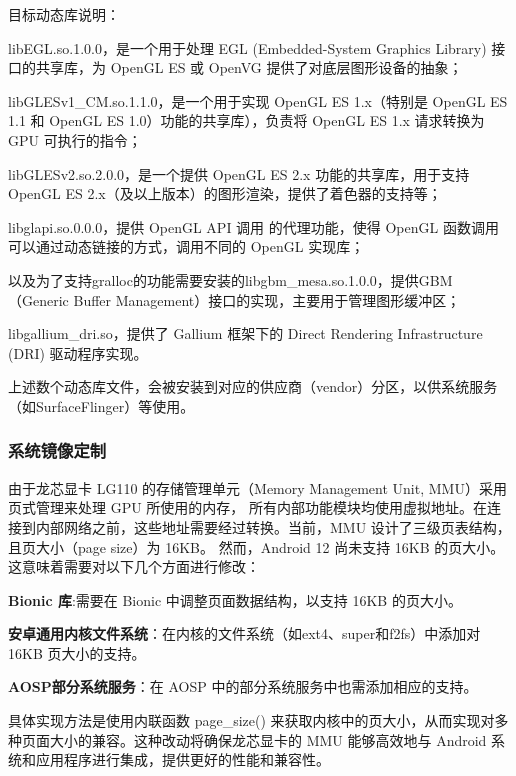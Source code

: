 目标动态库说明：

libEGL.so.1.0.0，是一个用于处理 EGL (Embedded-System Graphics Library) 接口的共享库，为 OpenGL ES 或 OpenVG 提供了对底层图形设备的抽象；

libGLESv1\_CM.so.1.1.0，是一个用于实现 OpenGL ES 1.x（特别是 OpenGL ES 1.1 和 OpenGL ES 1.0）功能的共享库），负责将 OpenGL ES 1.x 请求转换为 GPU 可执行的指令；

libGLESv2.so.2.0.0，是一个提供 OpenGL ES 2.x 功能的共享库，用于支持 OpenGL ES 2.x（及以上版本）的图形渲染，提供了着色器的支持等；

libglapi.so.0.0.0，提供 OpenGL API 调用 的代理功能，使得 OpenGL 函数调用可以通过动态链接的方式，调用不同的 OpenGL 实现库；

以及为了支持gralloc的功能需要安装的libgbm\_mesa.so.1.0.0，提供GBM（Generic Buffer Management）接口的实现，主要用于管理图形缓冲区；

libgallium\_dri.so，提供了 Gallium 框架下的 Direct Rendering Infrastructure (DRI) 驱动程序实现。

上述数个动态库文件，会被安装到对应的供应商（vendor）分区，以供系统服务（如SurfaceFlinger）等使用。

\subsubsection{系统镜像定制}
由于龙芯显卡 LG110 的存储管理单元（Memory Management Unit, MMU）采用页式管理来处理 GPU 所使用的内存，
所有内部功能模块均使用虚拟地址。在连接到内部网络之前，这些地址需要经过转换。当前，MMU 设计了三级页表结构，且页大小（page size）为 16KB。
然而，Android 12 尚未支持 16KB 的页大小。这意味着需要对以下几个方面进行修改：

\textbf{Bionic 库}:需要在 Bionic 中调整页面数据结构，以支持 16KB 的页大小。

\textbf{安卓通用内核文件系统}：在内核的文件系统（如ext4、super和f2fs）中添加对 16KB 页大小的支持。

\textbf{AOSP部分系统服务}：在 AOSP 中的部分系统服务中也需添加相应的支持。

具体实现方法是使用内联函数 page\_size() 来获取内核中的页大小，从而实现对多种页面大小的兼容。这种改动将确保龙芯显卡的 MMU 
能够高效地与 Android 系统和应用程序进行集成，提供更好的性能和兼容性。


